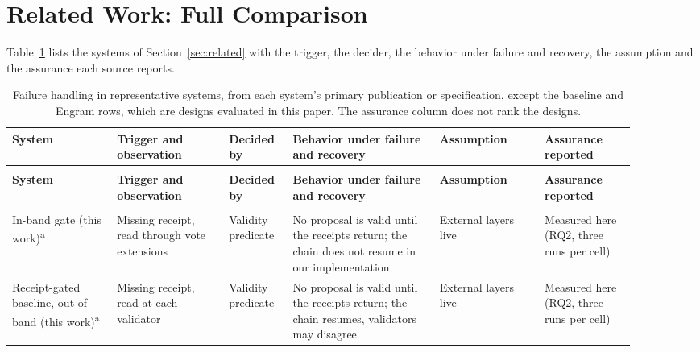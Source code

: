 \section{Related Work: Full Comparison}
\label{app:related}

Table~\ref{tab:comparison} lists the systems of Section~\ref{sec:related} with the trigger, the decider, the behavior under failure and recovery, the assumption and the assurance each source reports.

{\footnotesize
\renewcommand{\arraystretch}{1.03}
\setlength{\tabcolsep}{3pt}
\newcommand{\rc}[1]{\raggedright\arraybackslash #1}
\newcommand{\grp}[1]{\cmidrule(l{0pt}r{0pt}){1-6}\multicolumn{6}{@{}l}{\textbf{#1}}\\[1pt]}
\begin{longtable}{@{}>{\rc}p{0.155\linewidth}>{\rc}p{0.16\linewidth}>{\rc}p{0.09\linewidth}>{\rc}p{0.215\linewidth}>{\rc}p{0.15\linewidth}>{\rc}p{0.13\linewidth}@{}}
\caption{Failure handling in representative systems, from each system's
primary publication or specification, except the baseline and Engram rows, which
are designs evaluated in this paper. The
assurance column does not rank the designs.}
\label{tab:comparison}\\
\toprule
\textbf{System} & \textbf{Trigger and observation} & \textbf{Decided by} & \textbf{Behavior under failure and recovery} & \textbf{Assumption} & \textbf{Assurance reported} \\
\midrule
\endfirsthead
\multicolumn{6}{@{}l}{\textit{Table~\thetable{} (continued)}}\\
\toprule
\textbf{System} & \textbf{Trigger and observation} & \textbf{Decided by} & \textbf{Behavior under failure and recovery} & \textbf{Assumption} & \textbf{Assurance reported} \\
\midrule
\endhead
\bottomrule
\endfoot
\multicolumn{6}{@{}l}{\textbf{Reference point}}\\[1pt]
In-band gate (this work)\textsuperscript{a} & Missing receipt, read through vote extensions & Validity predicate & No proposal is valid until the receipts return; the chain does not resume in our implementation & External layers live & Measured here (RQ2, three runs per cell) \\
Receipt-gated baseline, out-of-band (this work)\textsuperscript{a} & Missing receipt, read at each validator & Validity predicate & No proposal is valid until the receipts return; the chain resumes, validators may disagree & External layers live & Measured here (RQ2, three runs per cell) \\

\end{longtable}}
